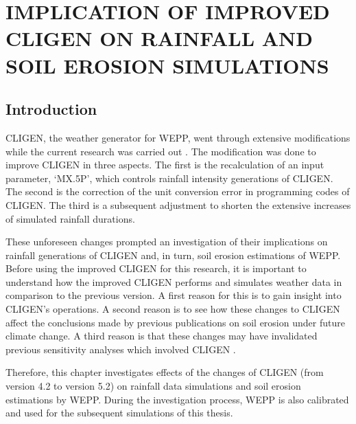 
\chapter{IMPLICATION OF IMPROVED CLIGEN ON RAINFALL AND SOIL EROSION
SIMULATIONS}
\label{sec:IMPLICATIONSOFIMPROVEDCLIGEN}

\section{Introduction}
\label{sec:ImprovedCligenIntroduction}
CLIGEN, the weather generator for WEPP, went through extensive modifications
while the current research was carried out \citep{yu2000-301}. The modification
was done to improve CLIGEN in three aspects. The first is the recalculation of
an input parameter, `{MX.5P}', which controls rainfall intensity generations of
CLIGEN. The second is the correction of the unit conversion error in programming
codes of CLIGEN. The third is a subsequent adjustment to shorten the extensive
increases of simulated rainfall durations.

These unforeseen changes prompted an investigation of their implications on
rainfall generations of CLIGEN and, in turn, soil erosion estimations of WEPP.
Before using the improved CLIGEN for this research, it is important to
understand how the improved CLIGEN performs and simulates weather data in
comparison to the previous version.
A first reason for this is to gain insight into CLIGEN's operations. A second
reason is to see how these changes to CLIGEN affect the conclusions made by
previous publications on soil erosion under future climate change. A third
reason is that these changes may have invalidated previous sensitivity analyses
which involved CLIGEN \citep{baffaut1996-447,zhang1996-855,baffaut1998-756,
favis-mortlock1998-141, favis-mortlock1999-329}.

Therefore, this chapter investigates effects of the changes of CLIGEN (from
version 4.2 to version 5.2) on rainfall data simulations and soil erosion
estimations by WEPP. During the investigation process, WEPP is also calibrated
and used for the subsequent simulations of this thesis.

